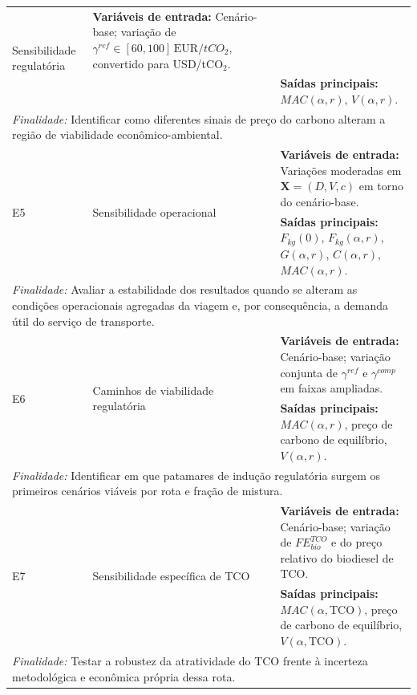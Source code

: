 \begin{table}[!ht]
\begin{tabular}{p{1.2cm} p{3.0cm} p{10.0cm}}
\multirow{2}{3.0cm}{Sensibilidade regulatória} &
\textbf{Variáveis de entrada:} Cenário-base; variação de $\gamma^{ref} \in [60,100]\,\text{EUR}/tCO_2$, convertido para USD/tCO$_2$. \\
& &
\vspace{1pt}\textbf{Saídas principais:} $MAC(\alpha,r)$, $V(\alpha,r)$. \\
\multicolumn{3}{p{14.2cm}}{\textit{Finalidade:} Identificar como diferentes sinais de preço do carbono alteram a região de viabilidade econômico-ambiental.} \\
\hline
\multirow{2}{*}{E5} &
\multirow{2}{3.0cm}{Sensibilidade operacional} &
\textbf{Variáveis de entrada:} Variações moderadas em $\mathbf{X}=(D,V,c)$ em torno do cenário-base. \\
& &
\vspace{1pt}\textbf{Saídas principais:} $F_{kg}(0)$, $F_{kg}(\alpha,r)$, $G(\alpha,r)$, $C(\alpha,r)$, $MAC(\alpha,r)$. \\
\multicolumn{3}{p{14.2cm}}{\textit{Finalidade:} Avaliar a estabilidade dos resultados quando se alteram as condições operacionais agregadas da viagem e, por consequência, a demanda útil do serviço de transporte.} \\
\hline
\multirow{2}{*}{E6} &
\multirow{2}{3.0cm}{Caminhos de viabilidade regulatória} &
\textbf{Variáveis de entrada:} Cenário-base; variação conjunta de $\gamma^{ref}$ e $\gamma^{comp}$ em faixas ampliadas. \\
& &
\vspace{1pt}\textbf{Saídas principais:} $MAC(\alpha,r)$, preço de carbono de equilíbrio, $V(\alpha,r)$. \\
\multicolumn{3}{p{14.2cm}}{\textit{Finalidade:} Identificar em que patamares de indução regulatória surgem os primeiros cenários viáveis por rota e fração de mistura.} \\
\hline
\multirow{2}{*}{E7} &
\multirow{2}{3.0cm}{Sensibilidade específica de \gls{TCO}} &
\textbf{Variáveis de entrada:} Cenário-base; variação de $FE_{bio}^{TCO}$ e do preço relativo do biodiesel de \gls{TCO}. \\
& &
\vspace{1pt}\textbf{Saídas principais:} $MAC(\alpha,\text{TCO})$, preço de carbono de equilíbrio, $V(\alpha,\text{TCO})$. \\
\multicolumn{3}{p{14.2cm}}{\textit{Finalidade:} Testar a robustez da atratividade do \gls{TCO} frente à incerteza metodológica e econômica própria dessa rota.} \\

\hline
\end{tabular}
\end{table}

